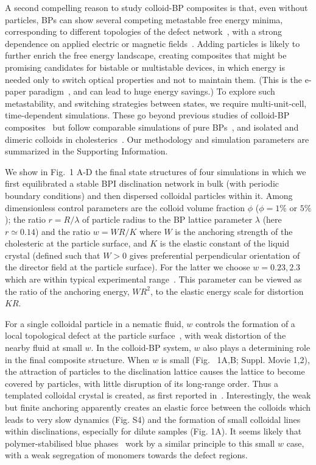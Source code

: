 \documentclass[12pt]{article}
\begin{document}
A second compelling reason to study colloid-BP composites is that, even without particles, BPs can show several competing metastable free energy minima,
corresponding to different topologies of the defect network~\cite{adriano,fukuda}, with a strong dependence on applied electric or magnetic fields~\cite{henrichfield}.
% 
Adding particles is likely to further enrich the free energy landscape, creating composites that might be promising candidates for bistable or multistable devices, in which energy is needed only to switch optical properties and not to maintain them. (This is the e-paper paradigm~\cite{epaper}, and can lead to huge energy savings.)
To explore such metastability, and switching strategies between states, we require multi-unit-cell, time-dependent simulations. These go beyond previous studies of colloid-BP composites~\cite{miha} but follow comparable simulations of pure BPs~\cite{bp3,henrichfield,domaingrowth}, and isolated and dimeric colloids in cholesterics~\cite{juho1,juho2}. Our methodology and simulation parameters are summarized in the Supporting Information.

We show in Fig.~1 A-D the final state structures of four simulations in which we first equilibrated a stable BPI disclination network in bulk (with periodic boundary conditions) and then dispersed colloidal particles within it. Among dimensionless control parameters are the colloid volume fraction $\phi$  ($\phi = 1\%$ or $5\%$); the ratio $r = R/\lambda$ of particle radius to the BP lattice parameter $\lambda$ (here $r\simeq 0.14$) and the ratio $w = WR/K$ where $W$ is the anchoring strength of the cholesteric at the particle surface, and $K$ is the elastic constant of the liquid crystal (defined such that $W>0$ gives preferential perpendicular orientation of the director field at the particle surface). For the latter we choose $w = 0.23, 2.3$ which are within typical experimental range~\cite{tiffany}. This parameter can be viewed as the ratio of the anchoring energy, $WR^2$, to the elastic energy scale for distortion $KR$. 

For a single colloidal particle in a nematic fluid, $w$ controls the formation of a local topological defect at the particle surface~\cite{stark}, with weak distortion of the nearby fluid at small $w$. In the colloid-BP system, $w$ also plays a determining role in the final composite structure. When $w$ is small (Fig.~ 1A,B; Suppl. Movie 1,2), the attraction of particles to the disclination lattice causes
 the lattice to become covered by particles, with little disruption of its
 long-range order. Thus a templated colloidal crystal is created, as first reported in~\cite{miha}. Interestingly, the weak but finite anchoring apparently creates an elastic force between the colloids which leads to very slow dynamics (Fig. S4) and the formation of small colloidal lines within disclinations, especially for dilute samples (Fig. 1A). It seems likely that polymer-stabilised  blue phases~\cite{kikuchi} work by a similar principle to this small $w$ case, with a weak segregation of monomers towards the defect regions.
\end{document}
